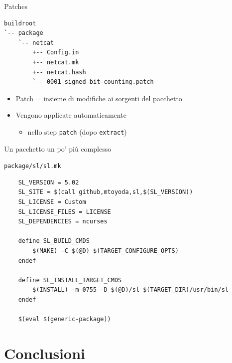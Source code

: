 \documentclass[xetex,table]{beamer}
\begin{document}
\begin{frame}[fragile]{Patches}
  \begin{verbatim}
buildroot
`-- package
    `-- netcat
        +-- Config.in
        +-- netcat.mk
        +-- netcat.hash
        `-- 0001-signed-bit-counting.patch
  \end{verbatim}
  \begin{itemize}
  \item Patch = insieme di modifiche ai sorgenti del pacchetto
  \item Vengono applicate automaticamente
    \begin{itemize}
    \item nello step {\tt patch} (dopo {\tt extract})
    \end{itemize}
  \end{itemize}
\end{frame}

\begin{frame}[fragile]{Un pacchetto un po' più complesso}

  {\tt package/sl/sl.mk}
  \begin{verbatim}
    SL_VERSION = 5.02
    SL_SITE = $(call github,mtoyoda,sl,$(SL_VERSION))
    SL_LICENSE = Custom
    SL_LICENSE_FILES = LICENSE
    SL_DEPENDENCIES = ncurses

    define SL_BUILD_CMDS
        $(MAKE) -C $(@D) $(TARGET_CONFIGURE_OPTS)
    endef

    define SL_INSTALL_TARGET_CMDS
        $(INSTALL) -m 0755 -D $(@D)/sl $(TARGET_DIR)/usr/bin/sl
    endef

    $(eval $(generic-package))
  \end{verbatim}
\end{frame}

\section{Conclusioni}
\end{document}
